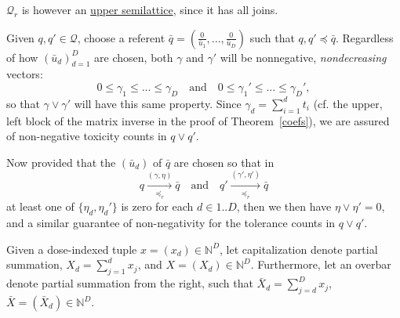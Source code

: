 \documentclass{article}
\newcommand{\N}{\mathbb{N}}
\newcommand{\Q}{\ensuremath{\mathcal{Q}}}
\begin{document}
\begin{conj}\label{lattice}
  $\Q_r$ is however an \underline{upper semilattice}, since it has all joins.
\end{conj}
\begin{sketch}
  Given $q, q' \in \Q$, choose a referent $\bar{q} = (\frac{0}{\bar{u}_1},...,\frac{0}{\bar{u}_D})$ such that $q, q' \preceq \bar{q}$.  Regardless of how $(\bar{u}_d)_{d=1}^D$ are chosen, both $\gamma$ and $\gamma'$ will be nonnegative, {\em nondecreasing} vectors:
  $$
  0 \le \gamma_1 \le ... \le \gamma_D \quad\text{and}\quad 0 \le \gamma_1' \le ... \le \gamma_D',
  $$
  so that $\gamma\vee\gamma'$ will have this same property.  Since $\gamma_d = \sum_{i=1}^d t_i$ (cf. the upper, left block of the matrix inverse in the proof of Theorem~\ref{coefs}), we are assured of non-negative toxicity counts in $q \vee q'$.

  Now provided that the $(\bar{u}_d)$ of $\bar{q}$ are chosen so that in
  $$
  q \xrightarrow[\preceq_r]{(\gamma,\eta)} \bar{q}
  \quad \text{and} \quad
  q' \xrightarrow[\preceq_r]{(\gamma',\eta')} \bar{q}
  $$
  at least one of $\{\eta_d, \eta_d'\}$ is zero for each $d\in 1..D$, then we then have $\eta \vee \eta' = 0$, and a similar guarantee of non-negativity for the tolerance counts in $q \vee q'$.
\end{sketch}

\begin{nota}
  Given a dose-indexed tuple $x = (x_d) \in \N^D$, let capitalization denote partial summation, $X_d = \sum_{j=1}^d x_j$, and $X = (X_d) \in \N^D$.  Furthermore, let an overbar denote partial summation from the right, such that $\bar{X}_d = \sum_{j=d}^D x_j$, $\bar{X} = (\bar{X}_d) \in \N^D$.
\end{nota}
\end{document}

